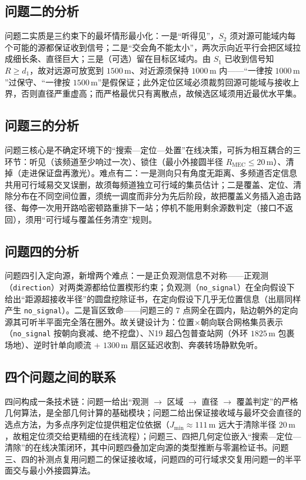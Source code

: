 \documentclass[12pt,a4paper]{article}
\newcommand{\Rmec}{R_{\mathrm{MEC}}}
\begin{document}
\subsection{问题二的分析}
问题二实质是三约束下的最坏情形最小化：一是“听得见”，$S_2$ 须对源可能域内每个可能的源都保证收到信号；二是“交会角不能太小”，两次示向近平行会把区域拉成细长条、直径巨大；三是（可选）留在目标区域内。由 $S_1$ 已收到信号知 $R\ge d_1$，故对远源可放宽到 $1500\,\mathrm{m}$、对近源须保持 $1000\,\mathrm{m}$ 内——“一律按 $1000\,\mathrm{m}$”过保守、“一律按 $1500\,\mathrm{m}$”是假保证；此外定位区域必须裁剪回源可能域与接收上界，否则直径严重虚高；而严格最优只有离散点，故候选区域须用近最优水平集。

\subsection{问题三的分析}
问题三核心是不确定环境下的“搜索---定位---处置”在线决策，可拆为相互耦合的三环节：听见（该频道至少响过一次）、锁住（最小外接圆半径 $\Rmec\le 20\,\mathrm{m}$）、清掉（走进保证盘再激光）。难点有二：一是测向只有角度无距离、多频道否定信息共用可行域易交叉误删，故须每频道独立可行域的集员估计；二是覆盖、定位、清除分布在不同空间位置，须统一调度而非分为先后阶段，故把覆盖义务插入追击路径、每停一次用开路哈密顿路重排下一站；停机不能用剩余源数判定（接口不返回），须用“可行域与覆盖任务清空”规则。

\subsection{问题四的分析}
问题四引入定向源，新增两个难点：一是正负观测信息不对称——正观测（\texttt{direction}）对两类源都给位置楔形约束；负观测（\texttt{no\_signal}）在全向假设下给出“距源超接收半径”的圆盘挖除证书，在定向假设下几乎无位置信息（出扇同样产生 \texttt{no\_signal}）。二是盲区致命——问题三的 7 点网全在圆内，贴边朝外的定向源其可听半平面完全落在圈外。故关键设计为：位置$\times$朝向联合网格集员表示（\texttt{no\_signal} 按朝向衰减、绝不挖盘）、N19 超凸包普查站网（外环 $1825\,\mathrm{m}$ 包裹场地）、逆时针单向顺流 + $1300\,\mathrm{m}$ 扇区延迟收割、奔袭转场静默免听。

\subsection{四个问题之间的联系}
四问构成一条技术链：问题一给出“观测 $\to$ 区域 $\to$ 直径 $\to$ 覆盖判定”的严格几何算法，是全部几何计算的基础模块；问题二给出保证接收域与最坏交会直径的选点方法，为多点序列定位提供粗定位依据（$J_{\min}\approx 111\,\mathrm{m}$ 远大于清除半径 $20\,\mathrm{m}$，故粗定位须交给更精细的在线流程）；问题三、四把几何定位嵌入“搜索---定位---清除”的在线决策闭环，其中问题四叠加定向源的类型推断与零漏检证书。问题三、四的补测点复用问题二的保证接收域，问题四的可行域求交复用问题一的半平面交与最小外接圆算法。
\end{document}

